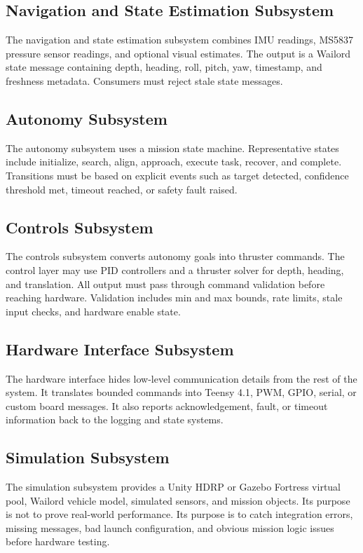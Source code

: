 \documentclass[12pt]{article}
\begin{document}
\subsection{Navigation and State Estimation Subsystem}
The navigation and state estimation subsystem combines IMU readings, MS5837 pressure sensor readings, and optional visual estimates. The output is a Wailord state message containing depth, heading, roll, pitch, yaw, timestamp, and freshness metadata. Consumers must reject stale state messages.

\subsection{Autonomy Subsystem}
The autonomy subsystem uses a mission state machine. Representative states include initialize, search, align, approach, execute task, recover, and complete. Transitions must be based on explicit events such as target detected, confidence threshold met, timeout reached, or safety fault raised.

\subsection{Controls Subsystem}
The controls subsystem converts autonomy goals into thruster commands. The control layer may use PID controllers and a thruster solver for depth, heading, and translation. All output must pass through command validation before reaching hardware. Validation includes min and max bounds, rate limits, stale input checks, and hardware enable state.

\subsection{Hardware Interface Subsystem}
The hardware interface hides low-level communication details from the rest of the system. It translates bounded commands into Teensy 4.1, PWM, GPIO, serial, or custom board messages. It also reports acknowledgement, fault, or timeout information back to the logging and state systems.

\subsection{Simulation Subsystem}
The simulation subsystem provides a Unity HDRP or Gazebo Fortress virtual pool, Wailord vehicle model, simulated sensors, and mission objects. Its purpose is not to prove real-world performance. Its purpose is to catch integration errors, missing messages, bad launch configuration, and obvious mission logic issues before hardware testing.
\end{document}
